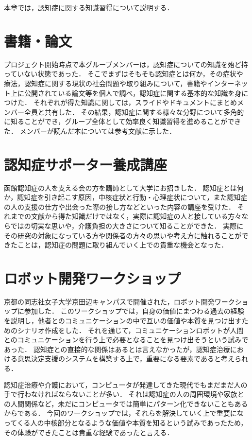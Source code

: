 \documentclass[../report]{subfiles}
\begin{document}
本章では，認知症に関する知識習得について説明する．

\section{書籍・論文}
プロジェクト開始時点で本グループメンバーは，認知症についての知識を殆ど持っていない状態であった．
そこでまずはそもそも認知症とは何か，その症状や療法，認知症に関する現状の社会問題や取り組みについて，書籍やインターネット上に公開されている論文等を個人で調べ，認知症に関する基本的な知識を身につけた．
それぞれが得た知識に関しては，スライドやドキュメントにまとめメンバー全員と共有した．
その結果，認知症に関する様々な分野について多角的に知ることができ，グループ全体として効率良く知識習得を進めることができた．
メンバーが読んだ本については参考文献に示した．

\section{認知症サポーター養成講座}
函館認知症の人を支える会の方を講師として大学にお招きした．
認知症とは何か，認知症を引き起こす原因，中核症状と行動・心理症状について，また認知症の人の支援の仕方や出会った際の接し方などといった内容の講座を受けた．
それまでの文献から得た知識だけではなく，実際に認知症の人と接している方々ならではの切実な思いや，介護負担の大きさについて知ることができた．
実際にその研究の対象になっている方や関係者の方々の思いや考え方に触れることができたことは，認知症の問題に取り組んでいく上での貴重な機会となった．

\section{ロボット開発ワークショップ}
京都の同志社女子大学京田辺キャンパスで開催された，ロボット開発ワークショップに参加した．
このワークショップでは，自身の価値にまつわる過去の経験を説明し，他者とのコミュニケーションの中で互いの価値や本質を見つけ出すためのシナリオ作成をした．
それを通じて，コミュニケーションロボットが人間とのコミュニケーションを行う上で必要となることを見つけ出そうという試みであった．
認知症との直接的な関係はあるとは言えなかったが，認知症治療における意思決定支援のシステムを構築する上で，重要になる要素であると考えられる．

認知症治療や介護において，コンピュータが発達してきた現代でもまだまだ人の手で行わなければならないことが多い．
それは認知症の人の周囲環境や家族との人間関係など，未だにコンピュータでは簡単にパターン化できないこともあるからである．
今回のワークショップでは，それらを解決していく上で重要になってくる人の中核部分となるような価値や本質を知るという試みであったため，その体験ができたことは貴重な経験であったと言える．
\end{document}
